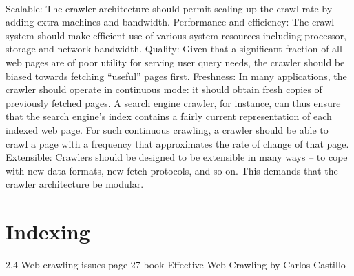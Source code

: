\\



Scalable: The crawler architecture should permit scaling up the crawl rate
by adding extra machines and bandwidth.
Performance and efficiency: The crawl system should make efficient use of
various system resources including processor, storage and network bandwidth.
Quality: Given that a significant fraction of all web pages are of poor utility for serving user query needs, the crawler should be biased towards
fetching “useful” pages first.
Freshness: In many applications, the crawler should operate in continuous
mode: it should obtain fresh copies of previously fetched pages. A search
engine crawler, for instance, can thus ensure that the search engine’s index
contains a fairly current representation of each indexed web page. For
such continuous crawling, a crawler should be able to crawl a page with
a frequency that approximates the rate of change of that page.
Extensible: Crawlers should be designed to be extensible in many ways –
to cope with new data formats, new fetch protocols, and so on. This demands that the crawler architecture be modular.

\section{Indexing}
2.4 Web crawling issues page 27 book Effective Web Crawling by Carlos Castillo